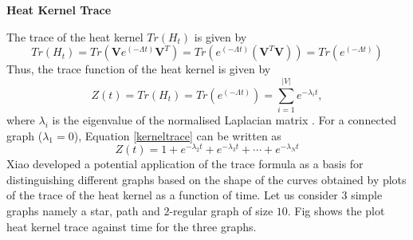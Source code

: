 \documentclass[12pt]{article}
\begin{document}
\textbf{Heat Kernel Trace}

The trace of the heat kernel $Tr(H_t)$ is given by
\begin{equation}
Tr(H_t) = Tr(\mathbf{V} e^{(-\Lambda t)} \mathbf{V}^T)=Tr( e^{(-\Lambda t)} (\mathbf{V}^T \mathbf{V})) = Tr(e^{(-\Lambda t)})
\end{equation}
Thus, the trace function of the heat kernel is given by 
\begin{equation}
Z(t) = Tr(H_t) = Tr(e^{(-\Lambda t)}) = \sum_{i=1}^{|V|} e^{-\lambda_i t},
\label{kerneltrace}
\end{equation}
where $\lambda_i$ is the eigenvalue of the normalised Laplacian matrix \cite{xiao2009graph}. 
For a connected graph ($\lambda_1 = 0$), Equation \ref{kerneltrace} can be written as 
\begin{equation}
Z(t) =  1+ e^{-\lambda_2 t} + e^{-\lambda_3t} + \cdots + e^{-\lambda_N t}
\end{equation}
Xiao \cite{xiao2009graph} developed a potential application of the trace formula as a basis for distinguishing different graphs based on the shape of the curves obtained by plots of the trace of the heat kernel as a function of time. Let us consider $3$ simple graphs namely a star, path and $2$-regular graph of size $10$. Fig shows the plot heat kernel trace against time for the three graphs.
\end{document}

